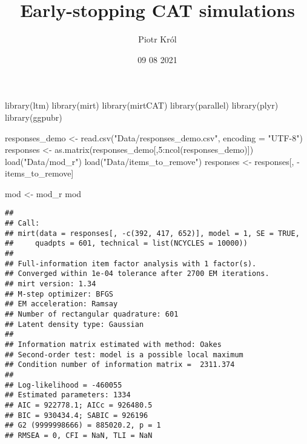 \documentclass[
]{article}
\title{Early-stopping CAT simulations}
\author{Piotr Król}
\date{09 08 2021}
\newenvironment{Shaded}{\begin{snugshade}}{\end{snugshade}}
\newcommand{\AttributeTok}[1]{\textcolor[rgb]{0.77,0.63,0.00}{#1}}
\newcommand{\DecValTok}[1]{\textcolor[rgb]{0.00,0.00,0.81}{#1}}
\newcommand{\FunctionTok}[1]{\textcolor[rgb]{0.00,0.00,0.00}{#1}}
\newcommand{\NormalTok}[1]{#1}
\newcommand{\OtherTok}[1]{\textcolor[rgb]{0.56,0.35,0.01}{#1}}
\newcommand{\SpecialCharTok}[1]{\textcolor[rgb]{0.00,0.00,0.00}{#1}}
\newcommand{\StringTok}[1]{\textcolor[rgb]{0.31,0.60,0.02}{#1}}
\begin{document}
\maketitle

\begin{Shaded}
\begin{Highlighting}[]
\FunctionTok{library}\NormalTok{(ltm)}
\FunctionTok{library}\NormalTok{(mirt)}
\FunctionTok{library}\NormalTok{(mirtCAT)}
\FunctionTok{library}\NormalTok{(parallel)}
\FunctionTok{library}\NormalTok{(plyr)}
\FunctionTok{library}\NormalTok{(ggpubr)}
\end{Highlighting}
\end{Shaded}

\begin{Shaded}
\begin{Highlighting}[]
\NormalTok{responses\_demo }\OtherTok{\textless{}{-}} \FunctionTok{read.csv}\NormalTok{(}\StringTok{"Data/responses\_demo.csv"}\NormalTok{, }\AttributeTok{encoding =} \StringTok{"UTF{-}8"}\NormalTok{)}
\NormalTok{responses }\OtherTok{\textless{}{-}} \FunctionTok{as.matrix}\NormalTok{(responses\_demo[,}\DecValTok{5}\SpecialCharTok{:}\FunctionTok{ncol}\NormalTok{(responses\_demo)])}
\FunctionTok{load}\NormalTok{(}\StringTok{"Data/mod\_r"}\NormalTok{)}
\FunctionTok{load}\NormalTok{(}\StringTok{"Data/items\_to\_remove"}\NormalTok{)}
\NormalTok{responses }\OtherTok{\textless{}{-}}\NormalTok{ responses[, }\SpecialCharTok{{-}}\NormalTok{items\_to\_remove]}
\end{Highlighting}
\end{Shaded}

\begin{Shaded}
\begin{Highlighting}[]
\NormalTok{mod }\OtherTok{\textless{}{-}}\NormalTok{ mod\_r}
\NormalTok{mod}
\end{Highlighting}
\end{Shaded}

\begin{verbatim}
## 
## Call:
## mirt(data = responses[, -c(392, 417, 652)], model = 1, SE = TRUE, 
##     quadpts = 601, technical = list(NCYCLES = 10000))
## 
## Full-information item factor analysis with 1 factor(s).
## Converged within 1e-04 tolerance after 2700 EM iterations.
## mirt version: 1.34 
## M-step optimizer: BFGS 
## EM acceleration: Ramsay 
## Number of rectangular quadrature: 601
## Latent density type: Gaussian 
## 
## Information matrix estimated with method: Oakes
## Second-order test: model is a possible local maximum
## Condition number of information matrix =  2311.374
## 
## Log-likelihood = -460055
## Estimated parameters: 1334 
## AIC = 922778.1; AICc = 926480.5
## BIC = 930434.4; SABIC = 926196
## G2 (9999998666) = 885020.2, p = 1
## RMSEA = 0, CFI = NaN, TLI = NaN
\end{verbatim}
\end{document}
